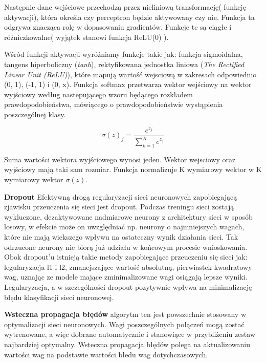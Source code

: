 \documentclass[a4paper,12pt]{article}
\begin{document}
        Następnie dane wejściowe przechodzą przez nieliniową transformację( funkcję aktywacji), która określa czy perceptron będzie aktywowany czy nie. Funkcja ta odgrywa znacząca rolę w dopasowaniu gradientów. Funkcje te są ciągłe i różniczkowalne( wyjątek stanowi funkcja ReLU(0) ).
        
        Wśród funkcji aktywacji wyróżniamy funkcje takie jak: funkcja sigmoidalna,  tangens hiperboliczny (\textit{tanh}), rektyfikowana jednostka liniowa (\textit{The Rectified Linear Unit (ReLU)}), 
        które mapują wartość wejsciową w zakresach odpowiednio (0, 1), (-1, 1) i (0, x). Funkcja softmax przetwarza wektor wejściowy na wektor wyjściowy według nastepującego wzoru będącego rozkładem prawdopodobieństwa, mówiącego o prawdopodobieństwie wystąpienia poszczególnej klasy. 
        
        \begin{displaymath}
            \sigma (z)_{j} = \frac{e^{z_{j}}}{ \sum_{k=1}^K e^{z_{j}}}
        \end{displaymath}

        Suma wartości wektora wyjściowego wynosi jeden. Wektor wejsciowy oraz wyjściowy mają taki sam rozmiar. Funkcja normalizuje K wymiarowy wektor w K wymiarowy wektor  $ \sigma (z)$. 
        
        \par \textbf{Dropout} 
        Efektywną drogą regularyzacji sieci neuronowych zapobiegającą zjawisku przeuczenia się sieci jest dropout. 
        Podczas treningu sieci zostają wykluczone, dezaktywowane nadmiarowe neurony z architektury sieci w sposób losowy, w efekcie może on uwzględniać np. neurony o najmniejszych wagach, które nie mają wiekszego wpływu na ostateczny wynik działania sieci. Tak odrzucone neurony nie biorą już udziału w końcowym procesie wnioskowania. Obok dropout'u istnieją takie metody zapobiegające przeuczeniu się sieci jak: legularyzacja l1 i l2, zmanejszające wartość absolutną, pierwiastek kwadratowy wag, uznając ze modele mające zminimalizowane wagi osiągają lepsze wyniki. Legularyzacja, a w szczególności dropout pozytywnie wpływa na minimalizację błędu klasyfikacji sieci neuronowej. 
        
	    \par \textbf{Wsteczna propagacja błędów}
        algorytm ten jest powszechnie stosowany w optymalizacji sieci neuronowych. Wagi poszczególnych połączeń mogą zostać wytrenowane, a więc dobrane automatycznie i stanowiące w przybliżeniu zestaw najbardziej optymalny. Wsteczna propagacja błędów polega na aktualizowaniu wartości wag na podstawie wartości błedu wag dotychczasowych.
\end{document}
